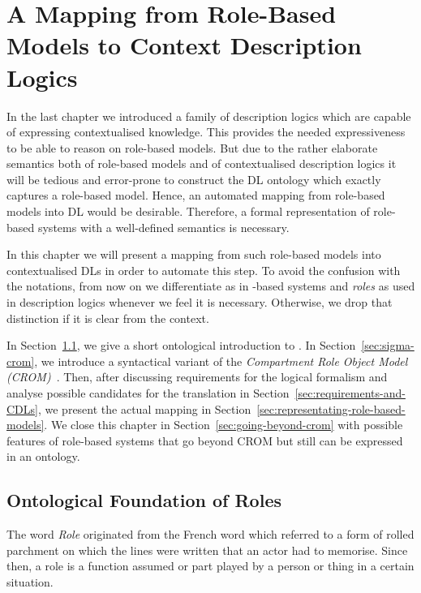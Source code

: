 
\chapter{A Mapping from Role-Based Models to Context Description Logics}
\label{cha:mapping}

In the last chapter we introduced a family of description logics which are capable of expressing
contextualised knowledge. This provides the needed expressiveness to be able to reason on role-based
models. But due to the rather elaborate semantics both of role-based models and of contextualised
description logics it will be tedious and error-prone to construct the DL ontology which exactly
captures a role-based model. Hence, an automated mapping from role-based models into DL would be
desirable. Therefore, a formal representation of role-based systems with a well-defined semantics is
necessary.

In this chapter we will present a mapping from such role-based models into contextualised DLs in
order to automate this step.
%
To avoid the confusion with the notations, from now on we differentiate \emph{\rosiroles} as
in \rosirole-based systems and \emph{roles} as used in description logics whenever we feel it is
necessary. Otherwise, we drop that distinction if it is clear from the context.
%

In Section~\ref{sec:rosiroles}, we give a short ontological introduction to \rosiroles.  In
Section~\ref{sec:sigma-crom}, we introduce a syntactical variant of the \emph{Compartment Role Object
  Model (CROM)}~\cite{KBG-SLE15}.  Then, after discussing requirements for the logical formalism and
analyse possible candidates for the translation in Section~\ref{sec:requirements-and-CDLs}, we
present the actual mapping in Section~\ref{sec:representating-role-based-models}. We close this
chapter in Section~\ref{sec:going-beyond-crom} with possible features of role-based systems that go
beyond CROM but still can be expressed in an ontology.


\section{Ontological Foundation of Roles}
\label{sec:rosiroles}

The word \emph{Role} originated from the French word \emph{\Rosirole} which referred to a form of
rolled parchment on which the lines were written that an actor had to memorise.  Since then, a role is a
function assumed or part played by a person or thing in a certain situation.

